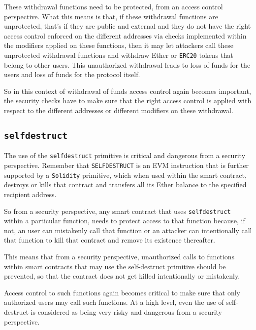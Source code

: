 These withdrawal functions need to be protected, from an access control
perspective. What this means is that, if these withdrawal functions are
unprotected, that's if they are public and external and they do not have
the right access control enforced on the different addresses via checks
implemented within the modifiers applied on these functions, then it may
let attackers call these unprotected withdrawal functions and withdraw
Ether or \texttt{ERC20} tokens that belong to other users. This
unauthorized withdrawal leads to loss of funds for the users and loss of
funds for the protocol itself.

So in this context of withdrawal of funds access control again becomes
important, the security checks have to make sure that the right access
control is applied with respect to the different addresses or different
modifiers on these withdrawal.

\subsection{\texorpdfstring{\texttt{selfdestruct}}{selfdestruct}}\label{selfdestruct}

The use of the \texttt{selfdestruct} primitive is critical and dangerous
from a security perspective. Remember that \texttt{SELFDESTRUCT} is an
EVM instruction that is further supported by a \texttt{Solidity}
primitive, which when used within the smart contract, destroys or kills
that contract and transfers all its Ether balance to the specified
recipient address.

So from a security perspective, any smart contract that uses
\texttt{selfdestruct} within a particular function, needs to protect
access to that function because, if not, an user can mistakenly call
that function or an attacker can intentionally call that function to
kill that contract and remove its existence thereafter.

This means that from a security perspective, unauthorized calls to
functions within smart contracts that may use the self-destruct
primitive should be prevented, so that the contract does not get killed
intentionally or mistakenly.

Access control to such functions again becomes critical to make sure
that only authorized users may call such functions. At a high level,
even the use of self-destruct is considered as being very risky and
dangerous from a security perspective.
